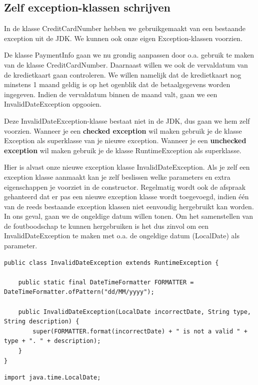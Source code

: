 \begin{itemize}
{\section{Zelf exception-klassen schrijven}

In de klasse CreditCardNumber hebben we gebruikgemaakt van een bestaande exception uit de JDK. We kunnen ook onze eigen Exception-klassen voorzien.

De klasse PaymentInfo gaan we nu grondig aanpassen door o.a. gebruik te maken van de klasse CreditCardNumber. Daarnaast willen we ook de vervaldatum van de kredietkaart gaan controleren. We willen namelijk dat de kredietkaart nog minstens 1 maand geldig is op het ogenblik dat de betaalgegevens worden ingegeven. Indien de vervaldatum binnen de maand valt, gaan we een InvalidDateException opgooien.

Deze InvalidDateException-klasse bestaat niet in de JDK, dus gaan we hem zelf voorzien. Wanneer je een \textbf{checked exception} wil maken gebruik je de klasse Exception als superklasse van je nieuwe exception. Wanneer je een \textbf{unchecked exception} wil maken gebruik je de klasse RuntimeException als superklasse.

Hier is alvast onze nieuwe exception klasse InvalidDateException. Als je zelf een exception klasse aanmaakt kan je zelf beslissen welke parameters en extra eigenschappen je voorziet in de constructor. Regelmatig wordt ook de afspraak gehanteerd dat er pas een nieuwe exception klasse wordt toegevoegd, indien \'e\'en van de reeds bestaande exception klassen niet eenvoudig hergebruikt kan worden. In ons geval, gaan we de ongeldige datum willen tonen. Om het samenstellen van de foutboodschap te kunnen hergebruiken is het dus zinvol om een InvalidDateException te maken met o.a. de ongeldige datum (LocalDate) als parameter.

\begin{lstlisting}
public class InvalidDateException extends RuntimeException {

	public static final DateTimeFormatter FORMATTER = DateTimeFormatter.ofPattern("dd/MM/yyyy");

	public InvalidDateException(LocalDate incorrectDate, String type, String description) {
		super(FORMATTER.format(incorrectDate) + " is not a valid " + type + ". " + description);
	}
}
\end{lstlisting}

\begin{lstlisting}
import java.time.LocalDate;


\end{lstlisting}}
\end{itemize}
